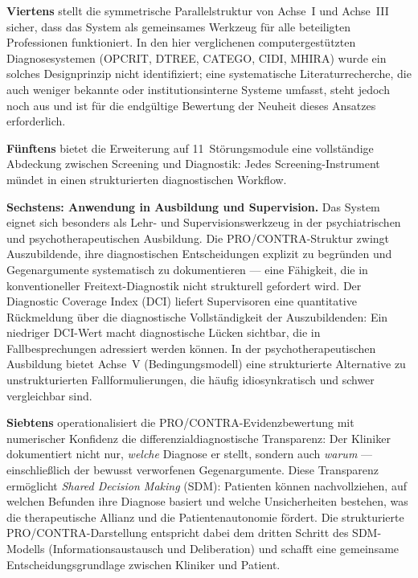 \documentclass[11pt,a4paper]{article}
\begin{document}
\textbf{Viertens} stellt die symmetrische Parallelstruktur von Achse~I und Achse~III sicher, dass das System als gemeinsames Werkzeug f\"ur alle beteiligten Professionen funktioniert. In den hier verglichenen computergest\"utzten Diagnosesystemen (OPCRIT, DTREE, CATEGO, CIDI, MHIRA) wurde ein solches Designprinzip nicht identifiziert; eine systematische Literaturrecherche, die auch weniger bekannte oder institutionsinterne Systeme umfasst, steht jedoch noch aus und ist f\"ur die endg\"ultige Bewertung der Neuheit dieses Ansatzes erforderlich.

\textbf{F\"unftens} bietet die Erweiterung auf 11~St\"orungsmodule eine vollst\"andige Abdeckung zwischen Screening und Diagnostik: Jedes Screening-Instrument m\"undet in einen strukturierten diagnostischen Workflow.

\textbf{Sechstens: Anwendung in Ausbildung und Supervision.} Das System eignet sich besonders als Lehr- und Supervisionswerkzeug in der psychiatrischen und psychotherapeutischen Ausbildung. Die PRO/CONTRA-Struktur zwingt Auszubildende, ihre diagnostischen Entscheidungen explizit zu begr\"unden und Gegenargumente systematisch zu dokumentieren --- eine F\"ahigkeit, die in konventioneller Freitext-Diagnostik nicht strukturell gefordert wird. Der Diagnostic Coverage Index (DCI) liefert Supervisoren eine quantitative R\"uckmeldung \"uber die diagnostische Vollst\"andigkeit der Auszubildenden: Ein niedriger DCI-Wert macht diagnostische L\"ucken sichtbar, die in Fallbesprechungen adressiert werden k\"onnen. In der psychotherapeutischen Ausbildung bietet Achse~V (Bedingungsmodell) eine strukturierte Alternative zu unstrukturierten Fallformulierungen, die h\"aufig idiosynkratisch und schwer vergleichbar sind.

\textbf{Siebtens} operationalisiert die PRO/CONTRA-Evidenzbewertung mit numerischer Konfidenz die differenzialdiagnostische Transparenz: Der Kliniker dokumentiert nicht nur, \textit{welche} Diagnose er stellt, sondern auch \textit{warum} --- einschlie\ss{}lich der bewusst verworfenen Gegenargumente. Diese Transparenz erm\"oglicht \textit{Shared Decision Making} (SDM): Patienten k\"onnen nachvollziehen, auf welchen Befunden ihre Diagnose basiert und welche Unsicherheiten bestehen, was die therapeutische Allianz und die Patientenautonomie f\"ordert. Die strukturierte PRO/CONTRA-Darstellung entspricht dabei dem dritten Schritt des SDM-Modells (Informationsaustausch und Deliberation) und schafft eine gemeinsame Entscheidungsgrundlage zwischen Kliniker und Patient.
\end{document}
